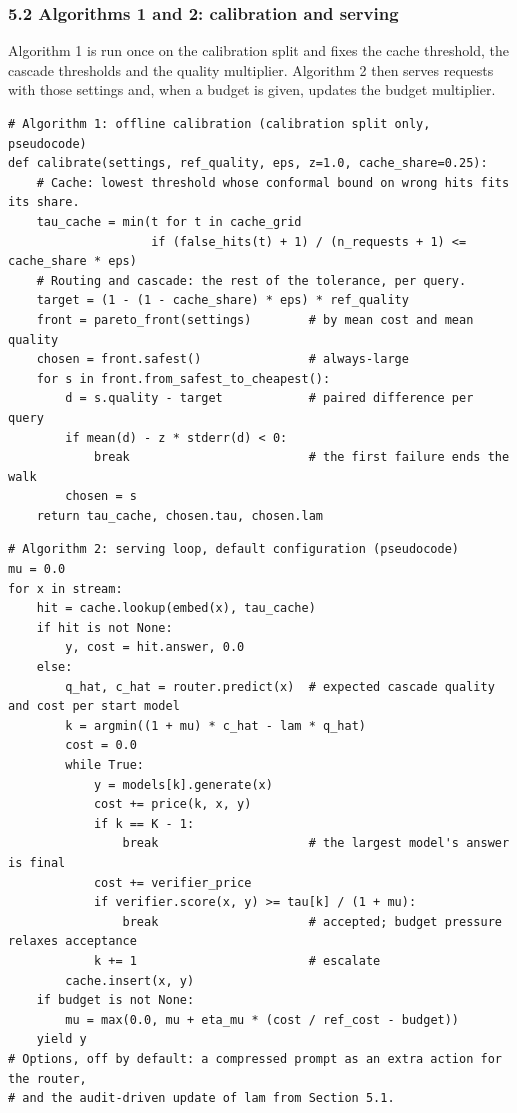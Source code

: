 \documentclass[
  10pt,
]{article}
\begin{document}
\subsubsection{5.2 Algorithms 1 and 2: calibration and
serving}\label{algorithms-1-and-2-calibration-and-serving}

Algorithm 1 is run once on the calibration split and fixes the cache
threshold, the cascade thresholds and the quality multiplier. Algorithm
2 then serves requests with those settings and, when a budget is given,
updates the budget multiplier.

\begin{verbatim}
# Algorithm 1: offline calibration (calibration split only, pseudocode)
def calibrate(settings, ref_quality, eps, z=1.0, cache_share=0.25):
    # Cache: lowest threshold whose conformal bound on wrong hits fits its share.
    tau_cache = min(t for t in cache_grid
                    if (false_hits(t) + 1) / (n_requests + 1) <= cache_share * eps)
    # Routing and cascade: the rest of the tolerance, per query.
    target = (1 - (1 - cache_share) * eps) * ref_quality
    front = pareto_front(settings)        # by mean cost and mean quality
    chosen = front.safest()               # always-large
    for s in front.from_safest_to_cheapest():
        d = s.quality - target            # paired difference per query
        if mean(d) - z * stderr(d) < 0:
            break                         # the first failure ends the walk
        chosen = s
    return tau_cache, chosen.tau, chosen.lam
\end{verbatim}

\begin{verbatim}
# Algorithm 2: serving loop, default configuration (pseudocode)
mu = 0.0
for x in stream:
    hit = cache.lookup(embed(x), tau_cache)
    if hit is not None:
        y, cost = hit.answer, 0.0
    else:
        q_hat, c_hat = router.predict(x)  # expected cascade quality and cost per start model
        k = argmin((1 + mu) * c_hat - lam * q_hat)
        cost = 0.0
        while True:
            y = models[k].generate(x)
            cost += price(k, x, y)
            if k == K - 1:
                break                     # the largest model's answer is final
            cost += verifier_price
            if verifier.score(x, y) >= tau[k] / (1 + mu):
                break                     # accepted; budget pressure relaxes acceptance
            k += 1                        # escalate
        cache.insert(x, y)
    if budget is not None:
        mu = max(0.0, mu + eta_mu * (cost / ref_cost - budget))
    yield y
# Options, off by default: a compressed prompt as an extra action for the router,
# and the audit-driven update of lam from Section 5.1.
\end{verbatim}
\end{document}
